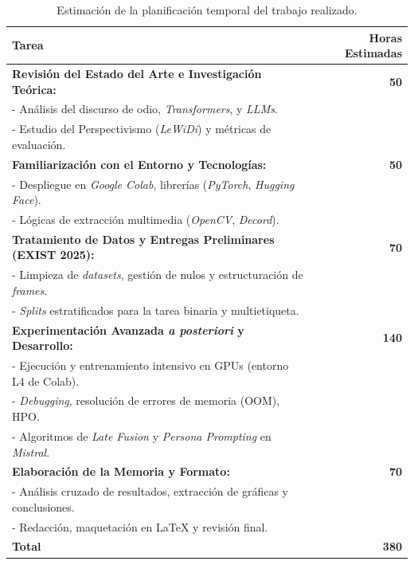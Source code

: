 \begin{table}[H]
    \centering
    \begin{tabularx}{\textwidth}{Xr}
        \toprule
        \textbf{Tarea} & \textbf{Horas Estimadas} \\
        \midrule
        \textbf{Revisión del Estado del Arte e Investigación Teórica:} & \textbf{50} \\
        \quad - Análisis del discurso de odio, \textit{Transformers}, y \textit{LLMs}. & \\
        \quad - Estudio del Perspectivismo (\textit{LeWiDi}) y métricas de evaluación. & \\
        \addlinespace[0.2em]
        \textbf{Familiarización con el Entorno y Tecnologías:} & \textbf{50} \\
        \quad - Despliegue en \textit{Google Colab}, librerías (\textit{PyTorch}, \textit{Hugging Face}). & \\
        \quad - Lógicas de extracción multimedia (\textit{OpenCV}, \textit{Decord}). & \\
        \addlinespace[0.2em]
        \textbf{Tratamiento de Datos y Entregas Preliminares (EXIST 2025):} & \textbf{70} \\
        \quad - Limpieza de \textit{datasets}, gestión de nulos y estructuración de \textit{frames}. & \\
        \quad - \textit{Splits} estratificados para la tarea binaria y multietiqueta. & \\
        \addlinespace[0.2em]
        \textbf{Experimentación Avanzada \textit{a posteriori} y Desarrollo:} & \textbf{140} \\
        \quad - Ejecución y entrenamiento intensivo en GPUs (entorno L4 de Colab). & \\
        \quad - \textit{Debugging}, resolución de errores de memoria (OOM), HPO. & \\
        \quad - Algoritmos de \textit{Late Fusion} y \textit{Persona Prompting} en \textit{Mistral}. & \\
        \addlinespace[0.2em]
        \textbf{Elaboración de la Memoria y Formato:} & \textbf{70} \\
        \quad - Análisis cruzado de resultados, extracción de gráficas y conclusiones. & \\
        \quad - Redacción, maquetación en \LaTeX{} y revisión final. & \\
        \midrule
        \textbf{Total} & \textbf{380} \\
        \bottomrule
    \end{tabularx}
    \caption{Estimación de la planificación temporal del trabajo realizado.}
    \label{tab:PlanificationTemporal}
\end{table}

